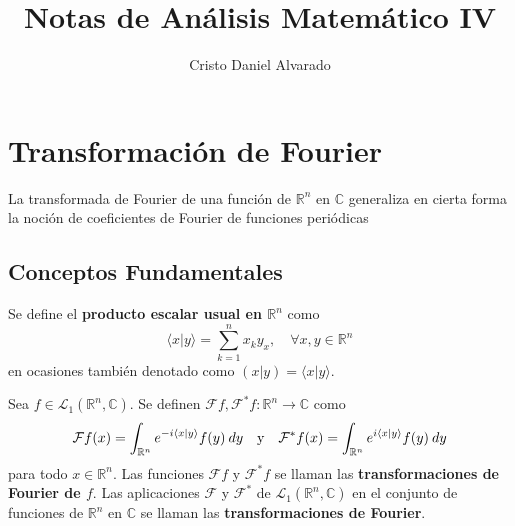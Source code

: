 \documentclass[12pt]{report}
\theoremstyle{largebreak}
\newcommand\cf[3]{\ensuremath{#1:#2\rightarrow#3}}
\newcommand\pint[2]{\ensuremath{\langle#1| #2\rangle}}
\begin{document}
    \setlength{\parskip}{5pt} %
    \setlength{\parindent}{12pt} %
    \title{Notas de Análisis Matemático IV}
    \author{Cristo Daniel Alvarado}
    \maketitle

    \tableofcontents %

    
    \chapter{Transformación de Fourier}
    
    La transformada de Fourier de una función de $\mathbb{R}^n$ en $\mathbb{C}$ generaliza en cierta forma la noción de coeficientes de Fourier de funciones periódicas
    
    \section{Conceptos Fundamentales}

    \begin{mydef}
        Se define el \textbf{producto escalar usual en $\mathbb{R}^n$} como
        \begin{equation*}
            \pint{x}{y}=\sum_{ k=1}^n x_ky_x,\quad\forall x,y\in\mathbb{R}^n
        \end{equation*}
        en ocasiones también denotado como $(x|y)=\pint{x}{y}$.
    \end{mydef}

    \begin{mydef}
        Sea $f\in\mathcal{L}_1(\mathbb{R}^n,\mathbb{C})$. Se definen $\cf{\mathcal{F}f,\mathcal{F}^*f}{\mathbb{R}^n}{\mathbb{C}} $ como
        \begin{equation*}
            \mathcal{F}f(x)=\int_{ \mathbb{R}^n}e^{ -i\pint{x}{y}}f(y)\:dy\quad\textup{y}\quad\mathcal{F}^*f(x)=\int_{ \mathbb{R}^n}e^{i\pint{x}{y}}f(y)\:dy
        \end{equation*}
        para todo $x\in\mathbb{R}^n$. Las funciones $\mathcal{F}f$ y $\mathcal{F}^*f$ se llaman las \textbf{transformaciones de Fourier de $f$}. Las aplicaciones $\mathcal{F}$ y $\mathcal{F}^*$ de $\mathcal{L}_1(\mathbb{R}^n,\mathbb{C})$ en el conjunto de funciones de $\mathbb{R}^n$ en $\mathbb{C}$ se llaman las \textbf{transformaciones de Fourier}.
    \end{mydef}
\end{document}
